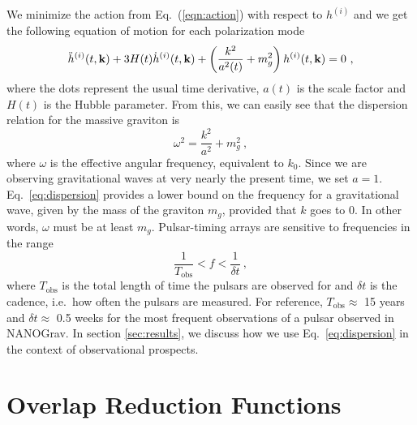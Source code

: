 \documentclass[prd,aps,psfig,nofootinbib,nobibnotes,superscriptaddress,preprintnumbers,times]{revtex4-2}\setlength{\topmargin}{-14mm}
\begin{document}
We minimize the action from Eq.\ (\ref{eqn:action}) with respect to $h^{(i)}$ and we get the following equation of motion for each polarization mode \cite{Maggiore:v2} 
\begin{equation}\label{eqn:eom}
    \ddot{h}^{(i)}(t, {\bf k}) + 3 H(t)\dot{h}^{(i)}(t, {\bf k}) + \left(\frac{k^2}{a^2(t)} + m_g^2\right)h^{(i)}(t, {\bf k}) = 0 \ ,
\end{equation}
where the dots represent the usual time derivative, $a(t)$ is the scale factor and $H(t)$ is the Hubble parameter. From this, we can easily see that the dispersion relation for the massive graviton is 
\begin{equation}\label{eq:dispersion}
    \omega^2 = \frac{k^2}{a^2} + m_g^2 \ ,
\end{equation}
where $\omega$ is the effective angular frequency, equivalent to $k_0$. Since we are observing gravitational waves at very nearly the present time, we set $a = 1$. Eq.\ \ref{eq:dispersion} provides a lower bound on the frequency for a gravitational wave, given by the mass of the graviton $m_g$, provided that $k$ goes to 0. In other words, $\omega$ must be at least $m_g$. Pulsar-timing arrays are sensitive to frequencies in the range \cite{Moore:2014lga}
\begin{equation}\label{eq:freqrange}
    \frac{1}{T_{\text{obs}}} < f < \frac{1}{\delta t} \ ,
\end{equation} where $T_{\text{obs}}$ is the total length of time the pulsars are observed for and $\delta t$ is the cadence, i.e.\ how often the pulsars are measured. For reference, $T_{\text{obs}} \approx$ 15 years and $\delta t \approx$ 0.5 weeks for the most frequent observations of a pulsar observed in NANOGrav. In section \ref{sec:results}, we discuss how we use Eq.\ \ref{eq:dispersion} in the context of observational prospects. 

\section{Overlap Reduction Functions}\label{sec:overlap}
\end{document}
